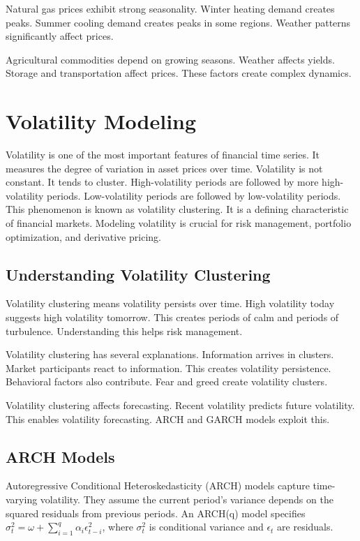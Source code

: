 Natural gas prices exhibit strong seasonality. Winter heating demand creates peaks. Summer cooling demand creates peaks in some regions. Weather patterns significantly affect prices.

Agricultural commodities depend on growing seasons. Weather affects yields. Storage and transportation affect prices. These factors create complex dynamics.

\section{Volatility Modeling}

Volatility is one of the most important features of financial time series. It measures the degree of variation in asset prices over time. Volatility is not constant. It tends to cluster. High-volatility periods are followed by more high-volatility periods. Low-volatility periods are followed by low-volatility periods. This phenomenon is known as volatility clustering. It is a defining characteristic of financial markets. Modeling volatility is crucial for risk management, portfolio optimization, and derivative pricing.

\subsection{Understanding Volatility Clustering}

Volatility clustering means volatility persists over time. High volatility today suggests high volatility tomorrow. This creates periods of calm and periods of turbulence. Understanding this helps risk management.

Volatility clustering has several explanations. Information arrives in clusters. Market participants react to information. This creates volatility persistence. Behavioral factors also contribute. Fear and greed create volatility clusters.

Volatility clustering affects forecasting. Recent volatility predicts future volatility. This enables volatility forecasting. ARCH and GARCH models exploit this.

\subsection{ARCH Models}

Autoregressive Conditional Heteroskedasticity (ARCH) models capture time-varying volatility. They assume the current period's variance depends on the squared residuals from previous periods. An ARCH(q) model specifies \(\sigma_t^2 = \omega + \sum_{i=1}^{q} \alpha_i \epsilon_{t-i}^2\), where \(\sigma_t^2\) is conditional variance and \(\epsilon_t\) are residuals.

